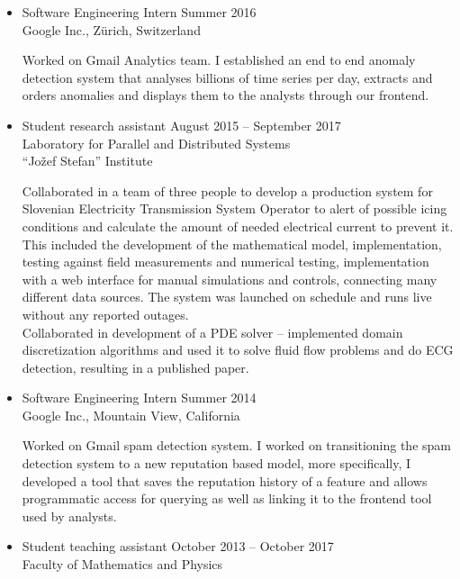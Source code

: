 \documentclass[line,margin]{res}
\newcommand{\wmeta}[1]{\sf#1\rm}
\newcommand{\wdesc}[1]{

#1

\vspace{6pt}}
\begin{document}
\begin{itemize}
{    purposes.}
  \wdesc{Teaching courses on programming, data structures and algorithms,
    numerical mathematics, basic calculus.}
  \item \wmeta{Software Engineering Intern \hfill Summer 2016 \\
    \hspace*{\fill} Google Inc., Z\"urich, Switzerland}
  \wdesc{Worked on Gmail Analytics team. I established an end to end anomaly
    detection system that analyses billions of time series per day, extracts and
    orders anomalies and displays them to the analysts through our frontend.}
  \item \wmeta{Student research assistant \hfill August 2015 -- September 2017 \\
    \hspace*{\fill} Laboratory for Parallel and Distributed Systems \\
    \hspace*{\fill} ``Jožef Stefan'' Institute}
  \wdesc{Collaborated in a team of three people to develop a production system
    for Slovenian Electricity Transmission System Operator to alert of possible
    icing conditions and calculate the amount of needed electrical current to
    prevent it. This included the development of the mathematical model,
    implementation, testing against field measurements and numerical testing,
    implementation with a web interface for manual simulations and controls,
    connecting many different data sources. The system was launched on schedule
    and runs live without any reported outages. \\[3pt]
    Collaborated in development of a PDE solver  -- implemented domain
    discretization algorithms and used it to solve fluid flow problems and do
    ECG detection, resulting in a published paper.}
  \item \wmeta{Software Engineering Intern \hfill Summer 2014 \\
    \hspace*{\fill} Google Inc., Mountain View, California}
  \wdesc{Worked on Gmail spam detection system. I worked on transitioning
    the spam detection system to a new reputation based model, more
    specifically, I developed a tool that saves the reputation history of a
    feature and allows programmatic access for querying as well as linking it to
    the frontend tool used by analysts.}
  \item \wmeta{Student teaching assistant \hfill October 2013 -- October 2017 \\
    \hspace*{\fill}  Faculty of Mathematics and Physics \\
}
\end{itemize}
\end{document}
